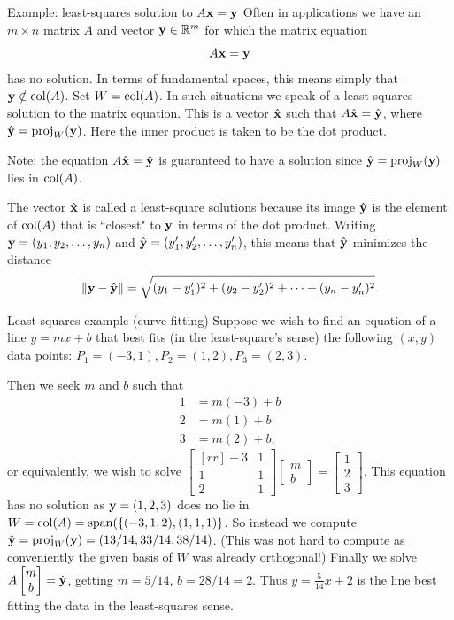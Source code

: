 \begin{frame}{Example: least-squares solution to $A{\mathbf x}={\mathbf y}$}
Often in applications we have an $m\times n$  matrix $A$ and vector ${\mathbf y}\in{\mathbb R}^m$ for which the matrix equation 
\[
A{\mathbf x}={\mathbf y}
\]  
has no solution. In terms of fundamental spaces, this means simply that ${\mathbf y}\notin \operatorname{col}(A)$. Set $W=\operatorname{col}(A)$.     
\bpause
In such situations we speak of a \alert{least-squares} solution to the matrix equation. This is a vector $\hat{{\mathbf x}}$ such that $A\hat{{\mathbf x}}=\hat{{\mathbf y}}$, where $\hat{{\mathbf y}}=\mbox{proj}_{W}({{\mathbf y}})$. Here the inner product is taken to be the dot product. 

Note: the equation $A\hat{{\mathbf x}}=\hat{{\mathbf y}}$ is guaranteed to have a solution since $\hat{{\mathbf y}}=\mbox{proj}_{W}({{\mathbf y}})$ lies in $\operatorname{col}(A)$. 

\pause
The vector $\hat{{\mathbf x}}$ is called a least-square solutions because its image $\hat{{\mathbf y}}$ is the element of $\operatorname{col}(A)$ that is ``closest" to ${\mathbf y}$ in terms of the dot product. 
\bspace 
Writing ${\mathbf y}=(y_1,y_2,\dots,y_n)$ and $\hat{{\mathbf y}}=(y_1',y_2',\dots, y_n')$, this means that $\hat{{\mathbf y}}$ minimizes the distance 
\[
\left\lVert{\mathbf y}-\hat{{\mathbf y}}\right\rVert=\sqrt{(y_1-y_1')^2+(y_2-y_2')^2+\cdots +(y_n-y_n')^2}.
\]  
\end{frame}
\begin{frame}{Least-squares example (curve fitting)}
Suppose we wish to find an equation of a line $y=mx+b$ that best fits (in the least-square's sense) the following $(x,y)$ data points: $P_1=(-3,1), P_2=(1,2), P_3=(2,3)$. 

\pause
Then we seek $m$ and $b$ such that 
\begin{align*}
1&=m(-3)+b\\
2&=m(1)+b\\
3&=m(2)+b,
\end{align*} 
or equivalently, we wish to solve 
$
\begin{bmatrix}[rr]
-3&1\\ 1&1\\ 2&1
\end{bmatrix}
\begin{bmatrix}
m \\ b
\end{bmatrix}
=\begin{bmatrix}
1\\ 2\\ 3
\end{bmatrix}$. 
\bpause
This equation has no solution as ${\mathbf y}=(1,2,3)$ does no lie in $W=\operatorname{col}(A)=\operatorname{span}(\{(-3,1,2),(1,1,1)\}$. So instead we compute $\hat{{\mathbf y}}=\mbox{proj}_{W}({{\mathbf y}})=(13/14,33/14,38/14)$. (This was not hard to compute as conveniently the given basis of $W$ was already orthogonal!)  
\bpause
Finally we solve $A\begin{bmatrix}
m\\ b
\end{bmatrix}=\hat{{\mathbf y}}$, getting $m=5/14$, $b=28/14=2$. Thus $y=\frac{5}{14}x+2$ is the line best fitting the data in the least-squares sense. 
\end{frame}
